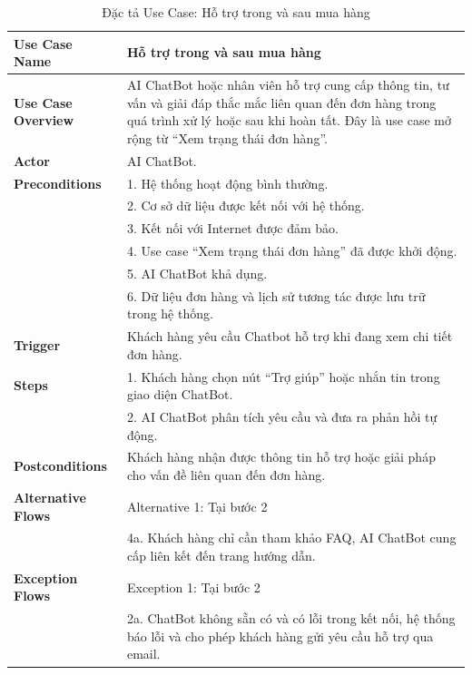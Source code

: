 {\begin{longtable}{|>{\bfseries}p{4cm}|p{11.5cm}|}
\caption{Đặc tả Use Case: Hỗ trợ trong và sau mua hàng}
\label{tab:uc-post-purchase-support} \\
\hline
\textbf{Use Case Name} & Hỗ trợ trong và sau mua hàng \\
\hline
\textbf{Use Case Overview} & AI ChatBot hoặc nhân viên hỗ trợ cung cấp thông tin, tư vấn và giải đáp thắc mắc liên quan đến đơn hàng trong quá trình xử lý hoặc sau khi hoàn tất. Đây là use case mở rộng từ “Xem trạng thái đơn hàng”. \\
\hline
\textbf{Actor} & AI ChatBot. \\
\hline
\textbf{Preconditions} & 1. Hệ thống hoạt động bình thường. \\
& 2. Cơ sở dữ liệu được kết nối với hệ thống. \\
& 3. Kết nối với Internet được đảm bảo. \\
& 4. Use case “Xem trạng thái đơn hàng” đã được khởi động. \\
& 5. AI ChatBot khả dụng. \\
& 6. Dữ liệu đơn hàng và lịch sử tương tác được lưu trữ trong hệ thống. \\
\hline
\textbf{Trigger} & Khách hàng yêu cầu Chatbot hỗ trợ khi đang xem chi tiết đơn hàng. \\
\hline
\textbf{Steps} & 1. Khách hàng chọn nút “Trợ giúp” hoặc nhắn tin trong giao diện ChatBot. \\
& 2. AI ChatBot phân tích yêu cầu và đưa ra phản hồi tự động. \\
\hline
\textbf{Postconditions} & Khách hàng nhận được thông tin hỗ trợ hoặc giải pháp cho vấn đề liên quan đến đơn hàng. \\
\hline
\textbf{Alternative Flows} & Alternative 1: Tại bước 2 \\
& 4a. Khách hàng chỉ cần tham khảo FAQ, AI ChatBot cung cấp liên kết đến trang hướng dẫn. \\
\hline
\textbf{Exception Flows} & Exception 1: Tại bước 2 \\
& 2a. ChatBot không sẵn có và có lỗi trong kết nối, hệ thống báo lỗi và cho phép khách hàng gửi yêu cầu hỗ trợ qua email. \\
\hline
\end{longtable}

}
